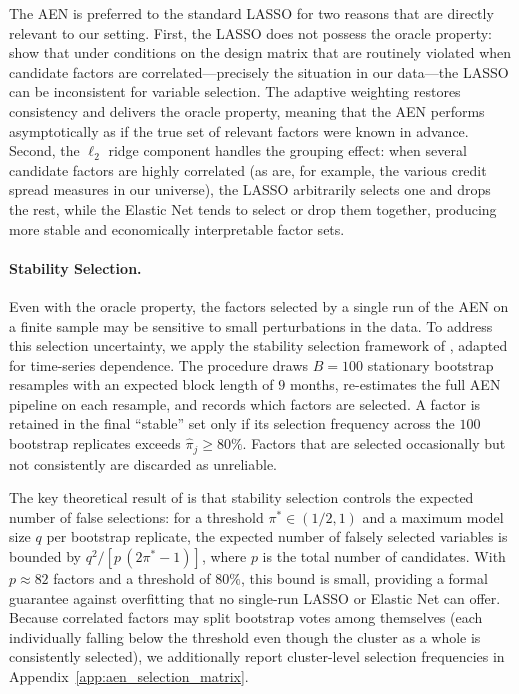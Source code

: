 The AEN is preferred to the standard LASSO for two reasons that are
directly relevant to our setting. First, the LASSO does not possess
the oracle property: \citet{zou2009adaptive} show that under
conditions on the design matrix that are routinely violated when
candidate factors are correlated---precisely the situation in our
data---the LASSO can be inconsistent for variable selection. The
adaptive weighting restores consistency and delivers the oracle
property, meaning that the AEN performs asymptotically as if the
true set of relevant factors were known in advance. Second, the
$\ell_2$ ridge component handles the grouping effect: when several
candidate factors are highly correlated (as are, for example, the
various credit spread measures in our universe), the LASSO
arbitrarily selects one and drops the rest, while the Elastic Net
tends to select or drop them together, producing more stable and
economically interpretable factor sets.

\paragraph{Stability Selection.}

Even with the oracle property, the factors selected by a single
run of the AEN on a finite sample may be sensitive to small
perturbations in the data. To address this selection uncertainty, we
apply the stability selection framework of
\citet{meinshausen2010stability}, adapted for time-series
dependence. The procedure draws $B = 100$ stationary bootstrap
resamples with an expected block length of $9$ months, re-estimates
the full AEN pipeline on each resample, and records which factors
are selected. A factor is retained in the final ``stable'' set only
if its selection frequency across the $100$ bootstrap replicates
exceeds $\hat{\pi}_j \geq 80\%$. Factors that are selected
occasionally but not consistently are discarded as unreliable.

The key theoretical result of \citet{meinshausen2010stability} is
that stability selection controls the expected number of false
selections: for a threshold $\pi^* \in (1/2, 1)$ and a maximum
model size $q$ per bootstrap replicate, the expected number of
falsely selected variables is bounded by $q^2 / [p\,(2\pi^* - 1)]$,
where $p$ is the total number of candidates. With $p \approx 82$
factors and a threshold of $80\%$, this bound is small, providing a
formal guarantee against overfitting that no single-run LASSO or
Elastic Net can offer. Because correlated factors may split
bootstrap votes among themselves (each individually falling below
the threshold even though the cluster as a whole is consistently
selected), we additionally report cluster-level selection frequencies
in Appendix~\ref{app:aen_selection_matrix}.

